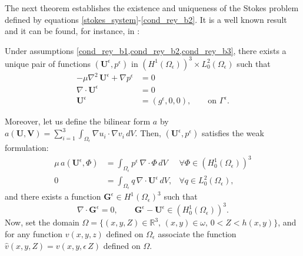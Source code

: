 The next theorem establishes the existence and uniqueness of the Stokes problem defined by equations \eqref*{stokes_system}-\eqref*{cond_rey_b2}. It is a well known result and it can be found, for instance, in \cite{girault1981}:
 \begin{theorem}\label{theo:t1}
Under assumptions \eqref*{cond_rey_b1,cond_rey_b2,cond_rey_b3}, there exists a unique pair of functions $(\mathbf{U}^\epsilon,p^\epsilon)$ in $(H^1(\Omega_\epsilon))^3\times L_0^2(\Omega_\epsilon)$ such that \begin{align*}
-\mu\nabla ^2\, \mathbf{U}^\epsilon+\nabla p^\epsilon&= 0 \\
\nabla \cdot \mathbf{U}^\epsilon &=0\\
\mathbf{U}^\epsilon&=(g^\epsilon,0,0),\qquad\text{on }\Gamma^\epsilon.
\end{align*}
\end{theorem}
Moreover, let us define the bilinear form $a$ by $a(\mathbf{U},\mathbf{V})=\sum_{i=1}^3\int_{\Omega_\epsilon}\nabla  u_i \cdot\nabla v_i\, dV$. Then, $(\mathbf{U}^\epsilon,p^\epsilon)$ satisfies the weak formulation:
\begin{align*}
\mu \,a(\mathbf{U}^\epsilon,\Phi) &= \int_{\Omega_\epsilon}p^\epsilon\, \nabla\cdot \Phi\,dV&\forall \Phi \in (H^1_0(\Omega_\epsilon))^3\\
0&=\int_{\Omega_\epsilon} q\, \nabla\cdot \mathbf{U}^\epsilon\,dV,&\forall q\in L_0^2(\Omega_\epsilon),
\end{align*}
and there exists a function $\mathbf{G}^\epsilon \in H^1(\Omega_\epsilon)^3$ such that
\begin{equation}
\nabla \cdot \mathbf{G}^\epsilon =0,\qquad \mathbf{G}^\epsilon-\mathbf{U}^\epsilon\in (H^1_0(\Omega_\epsilon))^3.
\end{equation}
Now, set the domain $\Omega=\{(x,y,Z)\in \mathbb{R}^3,\,(x,y)\in \omega,\, 0 < Z<h(x,y)\}$, and for any function $v(x,y,z)$ defined on $\Omega_\epsilon$ associate the function $\hat{v}(x,y,Z)=v(x,y,\epsilon\,Z)$ defined on $\Omega$. 


